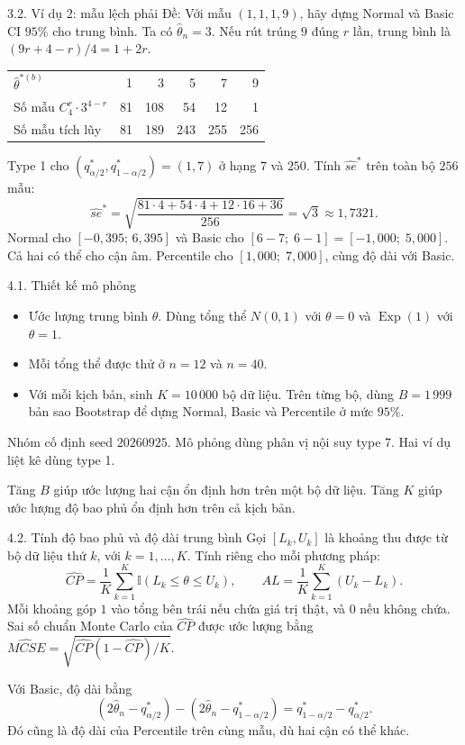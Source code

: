 \documentclass[aspectratio=43,10pt]{beamer}
\begin{document}
\begin{frame}{3.2. Ví dụ 2: mẫu lệch phải}
    \small
    Đề: Với mẫu $(1,1,1,9)$, hãy dựng Normal và Basic CI $95\%$ cho trung bình. Ta có $\hat\theta_n=3$. Nếu rút trúng $9$ đúng $r$ lần, trung bình là $(9r+4-r)/4=1+2r$.
    \medskip

    \centering
    \begin{tabular}{lrrrrr}
    \toprule $\hat\theta^{*(b)}$ & 1 & 3 & 5 & 7 & 9\\
    Số mẫu $C_4^r \cdot 3^{4-r}$ & 81 & 108 & 54 & 12 & 1\\
    Số mẫu tích lũy & 81 & 189 & 243 & 255 & 256\\ \bottomrule
    \end{tabular}\par
    \raggedright\medskip
    Type 1 cho $(q_{\alpha/2}^*,q_{1-\alpha/2}^*)=(1,7)$ ở hạng $7$ và $250$. Tính $\widehat{se}^*$ trên toàn bộ $256$ mẫu:
    \[
    \widehat{se}^*=\sqrt{\frac{81\cdot4+54\cdot4+12\cdot16+36}{256}}=\sqrt{3}\approx1{,}7321.
    \]
    Normal cho $[-0{,}395;\,6{,}395]$ và Basic cho $[6-7;\;6-1]=[-1{,}000;\;5{,}000]$.
    Cả hai có thể cho cận âm. Percentile cho $[1{,}000;\;7{,}000]$, cùng độ dài với Basic.
\end{frame}

\begin{frame}{4.1. Thiết kế mô phỏng}
    \begin{itemize}
        \item Ước lượng trung bình $\theta$. Dùng tổng thể $N(0,1)$ với $\theta=0$ và $\operatorname{Exp}(1)$ với $\theta=1$.
        \item Mỗi tổng thể được thử ở $n=12$ và $n=40$.
        \item Với mỗi kịch bản, sinh $K=10\,000$ bộ dữ liệu. Trên từng bộ, dùng $B=1\,999$ bản sao Bootstrap để dựng Normal, Basic và Percentile ở mức $95\%$.
    \end{itemize}
    \medskip
    Nhóm cố định seed $20260925$. Mô phỏng dùng phân vị nội suy type 7. Hai ví dụ liệt kê dùng type 1.
    \medskip

    Tăng $B$ giúp ước lượng hai cận ổn định hơn trên một bộ dữ liệu. Tăng $K$ giúp ước lượng độ bao phủ ổn định hơn trên cả kịch bản.
\end{frame}

\begin{frame}{4.2. Tính độ bao phủ và độ dài trung bình}
    Gọi $[L_k,U_k]$ là khoảng thu được từ bộ dữ liệu thứ $k$, với $k=1,\ldots,K$. Tính riêng cho mỗi phương pháp:
    \[
    \widehat{CP}=\frac{1}{K}\sum_{k=1}^K \mathbb{I}(L_k\le\theta\le U_k),
    \qquad
    AL=\frac{1}{K}\sum_{k=1}^K (U_k-L_k).
    \]
    Mỗi khoảng góp $1$ vào tổng bên trái nếu chứa giá trị thật, và $0$ nếu không chứa. Sai số chuẩn Monte Carlo của $\widehat{CP}$ được ước lượng bằng $\widehat{MCSE}=\sqrt{\widehat{CP}(1-\widehat{CP})/K}$.
    \medskip

    Với Basic, độ dài bằng
    \[
    (2\hat\theta_n-q_{\alpha/2}^*)-(2\hat\theta_n-q_{1-\alpha/2}^*)=q_{1-\alpha/2}^*-q_{\alpha/2}^*.
    \]
    Đó cũng là độ dài của Percentile trên cùng mẫu, dù hai cận có thể khác.
\end{frame}
\end{document}

